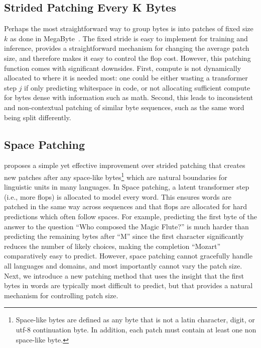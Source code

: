 \subsection{Strided Patching Every K Bytes}
\label{section:static-patch}

Perhaps the most straightforward way to group bytes is into patches of fixed size $k$ as done in MegaByte~\citep{yu2023megabyte}. The fixed stride is easy to implement for training and inference, provides a straightforward mechanism for changing the average patch size, and therefore makes it easy to control the flop cost. However, this patching function comes with significant downsides. First, compute is not dynamically allocated to where it is needed most: one could be either wasting a transformer step $j$ if only predicting whitespace in code, or not allocating sufficient compute for bytes dense with information such as math. Second, this leads to inconsistent and non-contextual patching of similar byte sequences, such as the same word being split differently.

\subsection{Space Patching}
\label{section:white-patch}

\citet{slagle2024spacebyte} proposes a simple yet effective improvement over strided patching that creates new patches after any space-like bytes\footnote{
    Space-like bytes are defined as any byte that is not a latin character, digit, or utf-8 continuation byte. In addition, each patch must contain at least one non space-like byte. } which are natural boundaries for linguistic units in many languages. In Space patching, a latent transformer step (i.e., more flops) is allocated to model every word. This ensures words are patched in the same way across sequences and that flops are allocated for hard predictions which often follow spaces. For example, predicting the first byte of the answer to the question ``Who composed the Magic Flute?\uline{\hspace{.6em}}'' is much harder than predicting the remaining bytes after ``M'' since the first character significantly reduces the number of likely choices, making the completion ``Mozart'' comparatively easy to predict. However, space patching cannot gracefully handle all languages and domains, and most importantly cannot vary the patch size. Next, we introduce a new patching method that uses the insight that the first bytes in words are typically most difficult to predict, but that provides a natural mechanism for controlling patch size.

